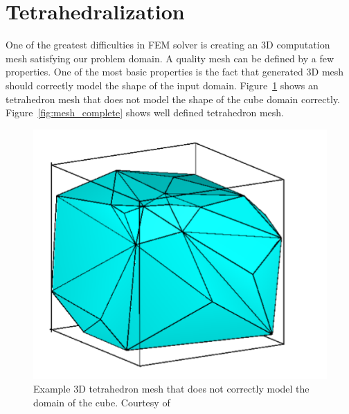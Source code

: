 \documentclass[en]{minipw} %
\begin{document}
\section{Tetrahedralization}

One of the greatest difficulties in FEM solver is creating an 3D computation mesh satisfying our problem domain. A quality mesh can be defined by a few properties.
One of the most basic properties is the fact that generated 3D mesh should correctly model the shape of the input domain. Figure~\ref{fig:mesh_incomplete} shows an tetrahedron mesh that does not model the shape of the cube domain correctly. Figure~\ref{fig:mesh_complete} shows well defined tetrahedron mesh.

\begin{figure}[h!]
\centering
\includegraphics[scale=0.5]{pictures/3dmesh_incomplite.png}
\caption[Poor 3D mesh]{Example 3D tetrahedron mesh that does not correctly model the domain of the cube. Courtesy of~\cite{delaunay_mesh}}
\label{fig:mesh_incomplete}
\end{figure}
\end{document}
